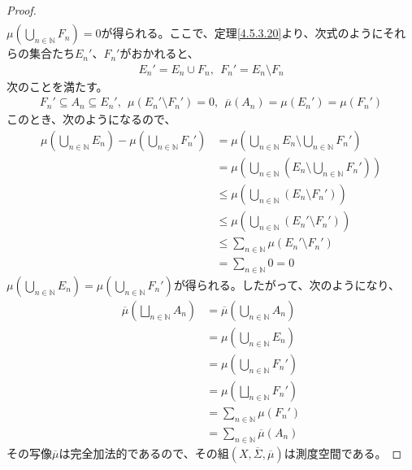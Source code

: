 \documentclass[dvipdfmx]{jsarticle}
\begin{document}
\begin{proof}
\begin{align*}
\end{align*}
$\mu\left( \bigcup_{n \in \mathbb{N}} F_{n} \right) = 0$が得られる。ここで、定理\ref{4.5.3.20}より、次式のようにそれらの集合たち$E_{n}'$、$F_{n}'$がおかれると、
\begin{align*}
E_{n}' = E_{n} \cup F_{n},\ \ F_{n}' = E_{n} \setminus F_{n}
\end{align*}
次のことを満たす。
\begin{align*}
F_{n}' \subseteq A_{n} \subseteq E_{n}',\ \ \mu\left( E_{n}' \setminus F_{n}' \right) = 0,\ \ \overline{\mu}\left( A_{n} \right) = \mu\left( E_{n}' \right) = \mu\left( F_{n}' \right)
\end{align*}
このとき、次のようになるので、
\begin{align*}
\mu\left( \bigcup_{n \in \mathbb{N}} E_{n} \right) - \mu\left( \bigcup_{n \in \mathbb{N}} F_{n}' \right) &= \mu\left( \bigcup_{n \in \mathbb{N}} E_{n} \setminus \bigcup_{n \in \mathbb{N}} F_{n}' \right)\\
&= \mu\left( \bigcup_{n \in \mathbb{N}} \left( E_{n} \setminus \bigcup_{n \in \mathbb{N}} F_{n}' \right) \right)\\
&\leq \mu\left( \bigcup_{n \in \mathbb{N}} \left( E_{n} \setminus F_{n}' \right) \right)\\
&\leq \mu\left( \bigcup_{n \in \mathbb{N}} \left( E_{n}' \setminus F_{n}' \right) \right)\\
&\leq \sum_{n \in \mathbb{N}} {\mu\left( E_{n}' \setminus F_{n}' \right)}\\
&= \sum_{n \in \mathbb{N}} 0 = 0
\end{align*}
$\mu\left( \bigcup_{n \in \mathbb{N}} E_{n} \right) = \mu\left( \bigcup_{n \in \mathbb{N}} F_{n}' \right)$が得られる。したがって、次のようになり、
\begin{align*}
\overline{\mu}\left( \bigsqcup_{n \in \mathbb{N}} A_{n} \right) &= \overline{\mu}\left( \bigcup_{n \in \mathbb{N}} A_{n} \right)\\
&= \mu\left( \bigcup_{n \in \mathbb{N}} E_{n} \right)\\
&= \mu\left( \bigcup_{n \in \mathbb{N}} F_{n}' \right)\\
&= \mu\left( \bigsqcup_{n \in \mathbb{N}} F_{n}' \right)\\
&= \sum_{n \in \mathbb{N}} {\mu\left( F_{n}' \right)}\\
&= \sum_{n \in \mathbb{N}} {\overline{\mu}\left( A_{n} \right)}
\end{align*}
その写像$\overline{\mu}$は完全加法的であるので、その組$\left( X,\overline{\varSigma},\overline{\mu} \right)$は測度空間である。\par

\end{proof}
\end{document}
